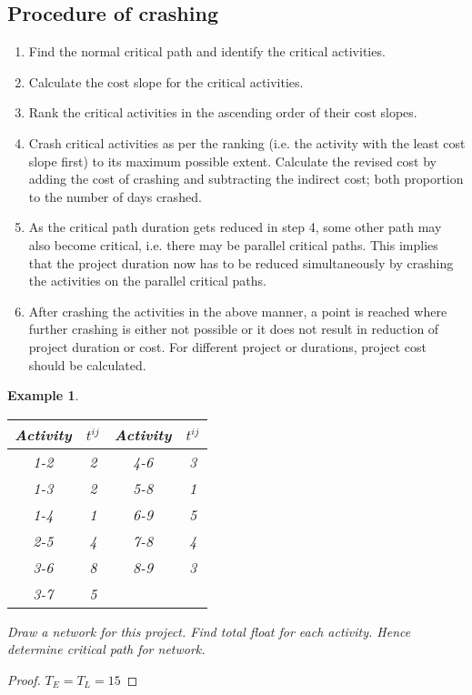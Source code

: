 \documentclass[oneside,11pt,pdftex]{book}%
\numberwithin{equation}{section}
\newtheorem{example}[theorem]{Example}
\numberwithin{section}{chapter}
\numberwithin{equation}{chapter}
\begin{document}
\subsection{Procedure of crashing}
\begin{enumerate}
	\item Find the normal critical path and identify the critical activities.
	\item Calculate the cost slope for the critical activities.
	\item Rank the critical activities in the ascending order of their cost slopes.
	\item Crash critical activities as per the ranking (i.e. the activity with the least cost slope first) to its maximum possible extent. Calculate the revised cost by adding the cost of crashing and subtracting the indirect cost; both proportion to the number of days crashed.
	\item As the critical path duration gets reduced in step 4, some other path may also become critical, i.e. there may be parallel critical paths. This implies that the project duration now has to be reduced simultaneously by crashing the activities on the parallel critical paths.
	\item After crashing the activities in the above manner, a point is reached where further crashing is either not possible or it does not result in reduction of project duration or cost. For different project or durations, project cost should be calculated.
\end{enumerate}

\begin{example}
\begin{table}[!htp]
	\centering
	
		\begin{tabular}{@{}cccc@{}}
			\toprule
			Activity & $t^{ij}$ & Activity & $t^{ij}$ \\ \midrule
			1-2 & 2 & 4-6 & 3 \\
			1-3 & 2 & 5-8 & 1 \\
			1-4 & 1 & 6-9 & 5 \\
			2-5 & 4 & 7-8 & 4 \\
			3-6 & 8 & 8-9 & 3 \\
			3-7 & 5 &  &  \\ \bottomrule
		\end{tabular}%
	
\end{table}
Draw a network for this project. Find total float for each activity. Hence determine critical path for network.
\end{example}
\begin{proof}
	$ T_E=T_L=15 $
\end{proof}
\end{document}

